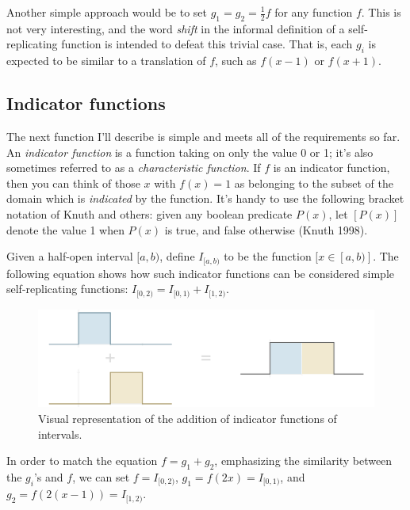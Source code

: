 \documentclass[20pt,]{extarticle}
\begin{document}
Another simple approach would be to set \(g_1 = g_2 = \frac{1}{2}f\) for
any function \(f\). This is not very interesting, and the word
\emph{shift} in the informal definition of a self-replicating function
is intended to defeat this trivial case. That is, each \(g_i\) is
expected to be similar to a translation of \(f\), such as \(f(x-1)\) or
\(f(x+1)\).

\subsection{Indicator functions}\label{indicator-functions}

The next function I'll describe is simple and meets all of the
requirements so far. An \emph{indicator function} is a function taking
on only the value 0 or 1; it's also sometimes referred to as a
\emph{characteristic function}. If \(f\) is an indicator function, then
you can think of those \(x\) with \(f(x) = 1\) as belonging to the
subset of the domain which is \emph{indicated} by the function. It's
handy to use the following bracket notation of Knuth and others: given
any boolean predicate \(P(x)\), let \([P(x)]\) denote the value 1 when
\(P(x)\) is true, and false otherwise (Knuth 1998).

Given a half-open interval \([a, b)\), define \(I_{[a, b)}\) to be the
function \([x\in[a, b)]\). The following equation shows how such
indicator functions can be considered simple self-replicating functions:
\(I_{[0, 2)} = I_{[0, 1)} + I_{[1, 2)}\).

\begin{figure}[htbp]
\centering
\includegraphics{images/pdfs/added_intervals6.pdf}
\caption{\label{fig:added_intervals}Visual representation of the
addition of indicator functions of
intervals.}\label{fig:addedux5fintervals}
\end{figure}

In order to match the equation \(f = g_1 + g_2\), emphasizing the
similarity between the \(g_i\)'s and \(f\), we can set
\(f = I_{[0, 2)}\), \(g_1 = f(2x) = I_{[0, 1)}\), and
\(g_2 = f(2(x - 1)) = I_{[1, 2)}\).
\end{document}
